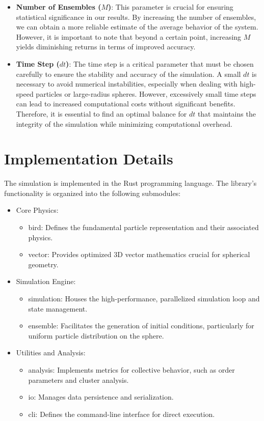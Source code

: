 \documentclass[12pt,a4paper]{article}
\begin{document}
\begin{itemize}
    \item \textbf{Number of Ensembles ($M$)}: 
    This parameter is crucial for ensuring statistical significance in our results. By increasing the number of ensembles, we can obtain a more reliable estimate of the average behavior of the system. However, it is important to note that beyond a certain point, increasing \(M\) yields diminishing returns in terms of improved accuracy.
    \item \textbf{Time Step ($dt$)}: 
    The time step is a critical parameter that must be chosen carefully to ensure the stability and accuracy of the simulation. A small \(dt\) is necessary to avoid numerical instabilities, especially when dealing with high-speed particles or large-radius spheres. However, excessively small time steps can lead to increased computational costs without significant benefits. Therefore, it is essential to find an optimal balance for \(dt\) that maintains the integrity of the simulation while minimizing computational overhead.
\end{itemize}

\section{Implementation Details}
The simulation is implemented in the Rust programming language. The library's functionality is organized into the following submodules:
\begin{itemize}
    \item Core Physics: \begin{itemize}
        \item bird: Defines the fundamental particle representation and their associated physics.
        \item vector: Provides optimized 3D vector mathematics crucial for spherical geometry.
    \end{itemize}
    \item Simulation Engine: \begin{itemize}
        \item simulation: Houses the high-performance, parallelized simulation loop and state management.
        \item ensemble: Facilitates the generation of initial conditions, particularly for uniform particle distribution on the sphere.
    \end{itemize}
    \item Utilities and Analysis: \begin{itemize}
        \item analysis: Implements metrics for collective behavior, such as order parameters and cluster analysis.
        \item io: Manages data persistence and serialization.
        \item cli: Defines the command-line interface for direct execution.
    \end{itemize}
\end{itemize}
\end{document}
